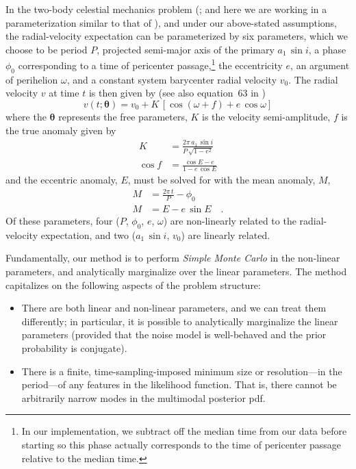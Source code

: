 \documentclass[manuscript, letterpaper]{aastex6}
\newcommand{\asini}{\ensuremath{a_1\,\sin i}}
\newcommand{\bs}[1]{\boldsymbol{#1}}
\begin{document}
In the two-body celestial mechanics problem (\citealt{Kepler:1609}; and here we
are working in a parameterization similar to that of \citealt{Murray:2010}), and
under our above-stated assumptions, the radial-velocity expectation can be
parameterized by six parameters, which we choose to be period $P$, projected
semi-major axis of the primary $\asini$, a phase $\phi_0$ corresponding to a
time of pericenter passage,\footnote{In our implementation, we subtract off the
median time from our data before starting so this phase actually corresponds to
the time of pericenter passage relative to the median time.} the eccentricity
$e$, an argument of perihelion $\omega$, and a constant system barycenter radial
velocity $v_0$.
The radial velocity $v$ at time $t$ is then given by (see also
equation~63 in \citealt{Murray:2010})
\begin{equation}
  v(t;\bs{\theta}) = v_0 + K\,[\cos(\omega + f) + e\,\cos\omega]
\end{equation}
where the $\bs{\theta}$ represents the free parameters, $K$ is the velocity
semi-amplitude, $f$ is the true anomaly given by
\begin{align}
  K &= \frac{2\pi\,\asini}{P\,\sqrt{1-e^2}}\\
  \cos f &= \frac{\cos E - e}{1 - e\, \cos E}
\end{align}
and the eccentric anomaly, $E$, must be solved for with the mean
anomaly, $M$,
\begin{align}
  M &= \frac{2\pi\, t}{P} - \phi_0\\
  M &= E - e\,\sin E \quad .
\end{align}
Of these parameters, four ($P$, $\phi_0$, $e$, $\omega$) are
non-linearly related to the radial-velocity expectation, and two
($\asini$, $v_0$) are linearly related.

Fundamentally, our method is to perform \emph{Simple Monte Carlo} in
the non-linear parameters, and analytically marginalize over the linear
parameters.
The method capitalizes on the following aspects of the problem
structure:
\begin{itemize}\itemsep0ex
\item There are both linear and non-linear parameters, and we can
  treat them differently; in particular, it is possible to
  analytically marginalize the linear parameters (provided that the
  noise model is well-behaved and the prior probability is conjugate).
\item There is a finite, time-sampling-imposed minimum size or
  resolution---in the period---of any features in the
  likelihood function. That is, there cannot be arbitrarily narrow
  modes in the multimodal posterior pdf.
\end{itemize}
\end{document}
